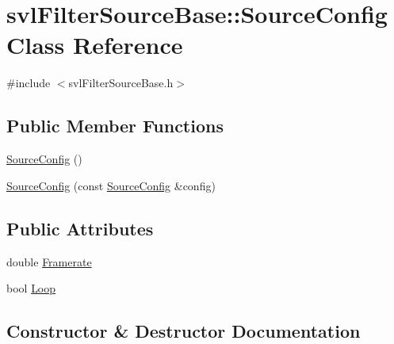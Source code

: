 \hypertarget{classsvl_filter_source_base_1_1_source_config}{}\section{svl\+Filter\+Source\+Base\+:\+:Source\+Config Class Reference}
\label{classsvl_filter_source_base_1_1_source_config}


{\ttfamily \#include $<$svl\+Filter\+Source\+Base.\+h$>$}

\subsection*{Public Member Functions}
\begin{DoxyCompactItemize}
\item 
\hyperlink{classsvl_filter_source_base_1_1_source_config_ac543d1114f71dcf851fcaa3dbe81fc76}{Source\+Config} ()
\item 
\hyperlink{classsvl_filter_source_base_1_1_source_config_a17c50fc4a717d3910222a5e96f838a86}{Source\+Config} (const \hyperlink{classsvl_filter_source_base_1_1_source_config}{Source\+Config} \&config)
\end{DoxyCompactItemize}
\subsection*{Public Attributes}
\begin{DoxyCompactItemize}
\item 
double \hyperlink{classsvl_filter_source_base_1_1_source_config_aa91946e246f802e4fdf7691e6a3c9fa6}{Framerate}
\item 
bool \hyperlink{classsvl_filter_source_base_1_1_source_config_aab00181cb4a94ee89f364f50597f7c9e}{Loop}
\end{DoxyCompactItemize}


\subsection{Constructor \& Destructor Documentation}
\hypertarget{classsvl_filter_source_base_1_1_source_config_ac543d1114f71dcf851fcaa3dbe81fc76}{}
